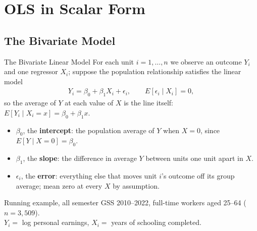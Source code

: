 \documentclass[aspectratio=169,11pt,xcolor=dvipsnames]{beamer}
\newcommand{\E}{E}
\begin{document}
\section[Scalar OLS]{OLS in Scalar Form}
\begin{frame}\sectionpage\end{frame}

\subsection*{The Bivariate Model}
\begin{frame}\subsectionpage\end{frame}

\begin{frame}{The Bivariate Linear Model}
For each unit $i = 1,\dots,n$ we observe an outcome $Y_i$ and one regressor
$X_i$; suppose the population relationship satisfies the linear model
\begin{align*}
  Y_i = \beta_0 + \beta_1 X_i + \epsilon_i ,
  \qquad \E[\epsilon_i \mid X_i] = 0 ,
\end{align*}
so the average of $Y$ at each value of $X$ is the line itself:
$\E[Y_i \mid X_i = x] = \beta_0 + \beta_1 x$.
\begin{itemize}\itemsep3pt
  \item $\beta_0$, the \textbf{intercept}: the population average of $Y$ when
        $X = 0$, since $\E[Y\mid X=0] = \beta_0$.
  \item $\beta_1$, the \textbf{slope}: the difference in average $Y$ between
        units one unit apart in $X$.
  \item $\epsilon_i$, the \textbf{error}: everything else that moves unit $i$'s
        outcome off its group average; mean zero at every $X$ by assumption.
\end{itemize}
\vskip2pt
\begin{block}{Running example, all semester}
GSS 2010--2022, full-time workers aged 25--64 ($n = 3{,}509$). \\
$Y_i = $ log personal earnings, $X_i = $ years of schooling completed.
\end{block}
\end{frame}
\end{document}
